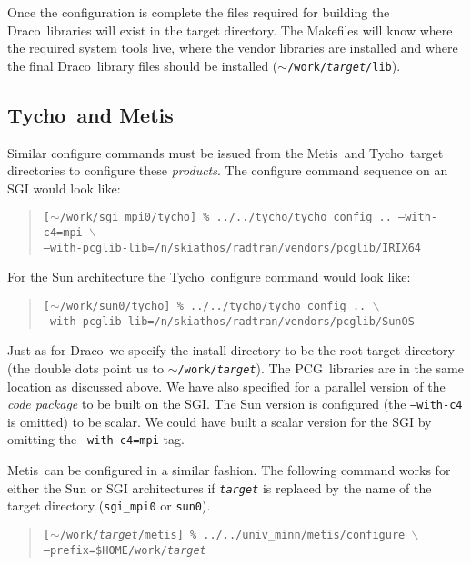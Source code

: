 \documentclass[11pt]{nmemo}
\newcommand{\comp}[1]{\normalfont\normalsize\texttt{#1}}
\newcommand{\draco}{{\normalfont\sffamily Draco}}
\newcommand{\tycho}{{\normalfont\sffamily Tycho}}
\newcommand{\metis}{{\normalfont\sffamily Metis}}
\newcommand{\pcg}{{\normalfont\sffamily PCG}}
\begin{document}
Once the configuration is complete the files required for building the 
\draco\ libraries will exist in the target directory.  The Makefiles
will know where the required system tools live, where the vendor
libraries are installed and where the final \draco\ library files
should be installed (\comp{$\sim$/work/\emph{target}/lib}).

\subsection{\tycho\ and \metis}

Similar configure commands must be issued from the \metis\ and \tycho\ 
target directories to configure these \emph{products}.  The configure
command sequence on an SGI would look like:

\begin{verse}
\texttt{[$\sim$/work/sgi\_mpi0/tycho] \% ../../tycho/tycho\_config 
.. --with-c4=mpi $\backslash$\\
\hspace{0.5in}--with-pcglib-lib=/n/skiathos/radtran/vendors/pcglib/IRIX64}
\end{verse}

For the Sun architecture the \tycho\ configure command would look
like:

\begin{verse}
\texttt{[$\sim$/work/sun0/tycho] \% ../../tycho/tycho\_config 
.. $\backslash$\\
\hspace{0.5in}--with-pcglib-lib=/n/skiathos/radtran/vendors/pcglib/SunOS}
\end{verse}

Just as for \draco\ we specify the install directory to be the root
target directory (the double dots point us to
\comp{$\sim$/work/\emph{target}}).  The \pcg\ libraries are in the
same location as discussed above.  We have also specified for a
parallel version of the \emph{code package} to be built on the SGI.
The Sun version is configured (the \comp{--with-c4} is omitted) to be
scalar.  We could have built a scalar version for the SGI by omitting
the \comp{--with-c4=mpi} tag.

\metis\ can be configured in a similar fashion.  The following command
works for either the Sun or SGI architectures if \comp{\emph{target}}
is replaced by the name of the target directory (\comp{sgi\_mpi0} or
\comp{sun0}).

\begin{verse}
\texttt{[$\sim$/work/\emph{target}/metis] \%
../../univ\_minn/metis/configure $\backslash$\\
\hspace{0.5in}--prefix=\${HOME}/work/\emph{target}}
\end{verse}
\end{document}
